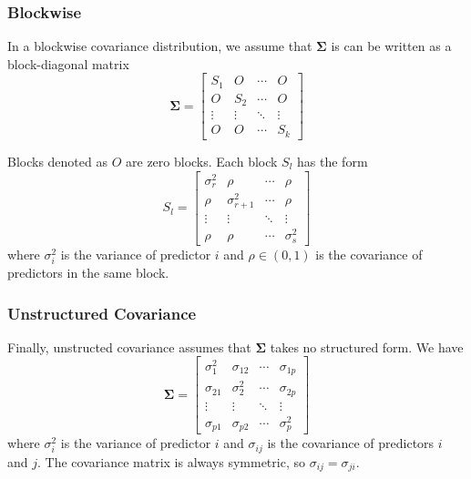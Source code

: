 \documentclass{article}
\begin{document}
\subsubsection{Blockwise}
In a blockwise covariance distribution, we assume that $\mathbf{\Sigma}$ is can be written as a block-diagonal matrix
\begin{equation}
	\mathbf{\Sigma} = \begin{bmatrix}
		S_1 & O & \cdots & O\\
		O & S_2 & \cdots & O\\
		\vdots & \vdots & \ddots & \vdots\\
		O & O & \cdots & S_k
	\end{bmatrix}
\end{equation}

Blocks denoted as $O$ are zero blocks. Each block $S_l$ has the form
\begin{equation}
	S_l = \begin{bmatrix}
		\sigma_{r}^2 & \rho & \cdots & \rho\\
		\rho & \sigma_{r + 1}^2 & \cdots & \rho\\
		\vdots & \vdots & \ddots & \vdots\\
		\rho & \rho & \cdots & \sigma_{s}^2
	\end{bmatrix}	
\end{equation}
where $\sigma_i^2$ is the variance of predictor $i$ and $\rho\in (0, 1)$ is the covariance of predictors in the same block.

\subsubsection{Unstructured Covariance}
Finally, unstructed covariance assumes that $\mathbf{\Sigma}$ takes no structured form. We have
\begin{equation}
	\mathbf{\Sigma} = \begin{bmatrix}
		\sigma_1^2 & \sigma_{12} & \cdots & \sigma_{1p}\\
		\sigma_{21} & \sigma_2^2 & \cdots & \sigma_{2p}\\
		\vdots & \vdots & \ddots & \vdots \\
		\sigma_{p1} & \sigma_{p2} & \cdots & \sigma_p^2
	\end{bmatrix}	
\end{equation}
where $\sigma_i^2$ is the variance of predictor $i$ and $\sigma_{ij}$ is the covariance of predictors $i$ and $j$. The covariance matrix is always symmetric, so $\sigma_{ij} = \sigma_{ji}$.
\end{document}
